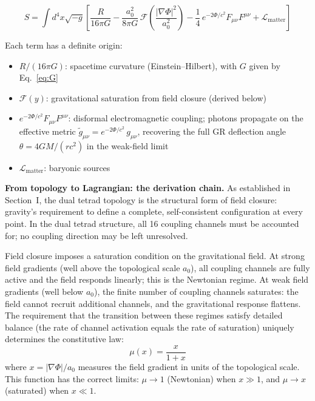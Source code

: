 \documentclass[11pt]{article}
\begin{document}
\begin{equation}
S = \int d^4x \sqrt{-g} \left[ \frac{R}{16\pi G} - \frac{a_0^2}{8\pi G}\,\mathcal{F}\!\left(\frac{|\nabla\Phi|^2}{a_0^2}\right) - \frac{1}{4}\,e^{-2\Phi/c^2} F_{\mu\nu}F^{\mu\nu} + \mathcal{L}_{\text{matter}} \right]
\label{eq:action}
\end{equation}

Each term has a definite origin:
\begin{itemize}[leftmargin=2em]
\item $R/(16\pi G)$: spacetime curvature (Einstein--Hilbert), with $G$ given by Eq.~\ref{eq:G}
\item $\mathcal{F}(y)$: gravitational saturation from field closure (derived below)
\item $e^{-2\Phi/c^2} F_{\mu\nu}F^{\mu\nu}$: disformal electromagnetic coupling; photons propagate on the effective metric $\tilde{g}_{\mu\nu} = e^{-2\Phi/c^2}\,g_{\mu\nu}$, recovering the full GR deflection angle $\theta = 4GM/(rc^2)$ in the weak-field limit
\item $\mathcal{L}_{\text{matter}}$: baryonic sources
\end{itemize}

\textbf{From topology to Lagrangian: the derivation chain.}\quad
As established in Section~I, the dual tetrad topology is the structural form of field closure: gravity's requirement to define a complete, self-consistent configuration at every point.
In the dual tetrad structure, all 16 coupling channels must be accounted for; no coupling direction may be left unresolved.

Field closure imposes a saturation condition on the gravitational field.
At strong field gradients (well above the topological scale $a_0$), all coupling channels are fully active and the field responds linearly; this is the Newtonian regime.
At weak field gradients (well below $a_0$), the finite number of coupling channels saturates: the field cannot recruit additional channels, and the gravitational response flattens.
The requirement that the transition between these regimes satisfy detailed balance (the rate of channel activation equals the rate of saturation) uniquely determines the constitutive law:
\begin{equation*}
\mu(x) = \frac{x}{1+x}
\end{equation*}
where $x = |\nabla\Phi|/a_0$ measures the field gradient in units of the topological scale.
This function has the correct limits: $\mu \to 1$ (Newtonian) when $x \gg 1$, and $\mu \to x$ (saturated) when $x \ll 1$.
\end{document}
